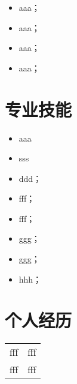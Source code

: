 \documentclass{resume}
\begin{document}
\begin{itemize}
\item[\color{RawSienna}{\faCheckCircleO}]{aaa；}

\item[\color{RawSienna}{\faCheckCircleO}]{aaa；}

\item[\color{RawSienna}{\faCheckCircleO}]{aaa；}

\item[\color{RawSienna}{\faCheckCircleO}]{aaa；}
\end{itemize}




\section{专业技能\;\color{RoyalBlue}{\faLaptop}}

\begin{itemize}
\item[\color{RawSienna}{\faCode}]{aaa}

\item[\color{RawSienna}{\faCode}]{sss}

\item[\color{RawSienna}{\faCode}]{ddd；}

\item[\color{RawSienna}{\faCode}]{fff；}

\item[\color{RawSienna}{\faCode}]{fff；}

\item[\color{RawSienna}{\faCode}]{ggg；}

\item[\color{RawSienna}{\faCode}]{ggg；}

\item[\color{RawSienna}{\faCode}]{hhh；}
\end{itemize}

\section{个人经历\;\color{Goldenrod}{\faTrophy}}
\begin{tabularx}{\textwidth}{Xl}
fff&fff\\
fff&fff\\
\end{tabularx}
\end{document}
